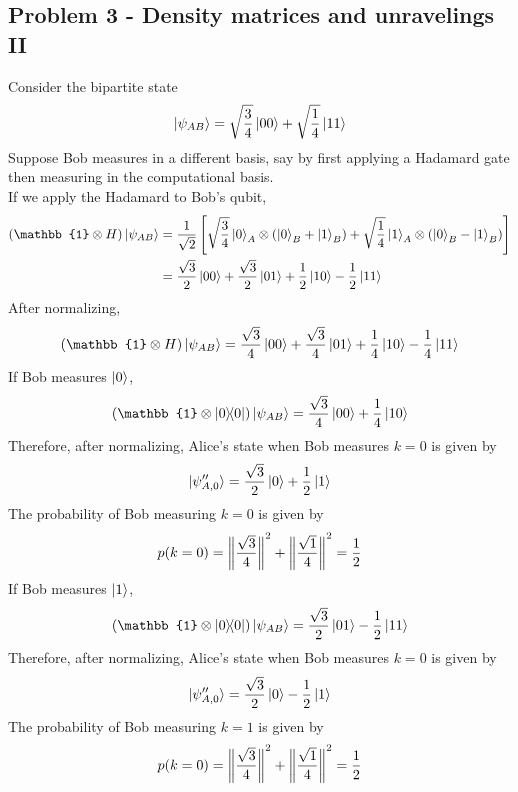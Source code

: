 \subsection{Problem 3 - Density matrices and unravelings II}
Consider the bipartite state 
\begin{equation}
    \ket{\psi_{AB}} = \sqrt{\frac{3}{4}}\ket{00} + \sqrt{\frac{1}{4}}\ket{11}
\end{equation}
Suppose Bob measures in a different basis, say by first applying a Hadamard gate then measuring in the computational basis. \\
If we apply the Hadamard to Bob's qubit,
\begin{align}
    (\mathbb{1} \otimes H)\ket{\psi_{AB}} &= \frac{1}{\sqrt{2}} \left[\sqrt{\frac{3}{4}}\ket{0}_A \otimes (\ket{0}_B + \ket{1}_B) + \sqrt{\frac{1}{4}}\ket{1}_A \otimes (\ket{0}_B - \ket{1}_B)\right] \\ 
    &= \frac{\sqrt{3}}{2} \ket{00} + \frac{\sqrt{3}}{2} \ket{01} + \frac{1}{2} \ket{10} - \frac{1}{2} \ket{11} 
\end{align}
After normalizing,
\begin{equation}
(\mathbb{1} \otimes H)\ket{\psi_{AB}} = \frac{\sqrt{3}}{4} \ket{00} + \frac{\sqrt{3}}{4} \ket{01} + \frac{1}{4} \ket{10} - \frac{1}{4} \ket{11} 
\end{equation}
If Bob measures $\ket{0}$, 
\begin{align}
    (\mathbb{1} \otimes \ketbra{0}{0}) \ket{\psi_{AB}} = \frac{\sqrt{3}}{4} \ket{00} +  \frac{1}{4} \ket{10}
\end{align}
Therefore, after normalizing, Alice's state when Bob measures $k = 0$ is given by 
\begin{equation}
    \ket{\psi''_{A,0}} = \frac{\sqrt{3}}{2} \ket{0} + \frac{1}{2} \ket{1}
\end{equation}
The probability of Bob measuring $k = 0$ is given by 
\begin{equation}
    p(k=0) = \norm{\frac{\sqrt{3}}{4}}^2 + \norm{\frac{\sqrt{1}}{4}}^2 = \frac{1}{2}
\end{equation}
If Bob measures $\ket{1}$, 
\begin{align}
    (\mathbb{1} \otimes \ketbra{0}{0}) \ket{\psi_{AB}} = \frac{\sqrt{3}}{2} \ket{01} -  \frac{1}{2} \ket{11}
\end{align}
Therefore, after normalizing, Alice's state when Bob measures $k = 0$ is given by 
\begin{equation}
    \ket{\psi''_{A,0}} = \frac{\sqrt{3}}{2} \ket{0} - \frac{1}{2} \ket{1}
\end{equation}
The probability of Bob measuring $k = 1$ is given by 
\begin{equation}
    p(k=0) = \norm{\frac{\sqrt{3}}{4}}^2 + \norm{\frac{\sqrt{1}}{4}}^2 = \frac{1}{2}
\end{equation}



